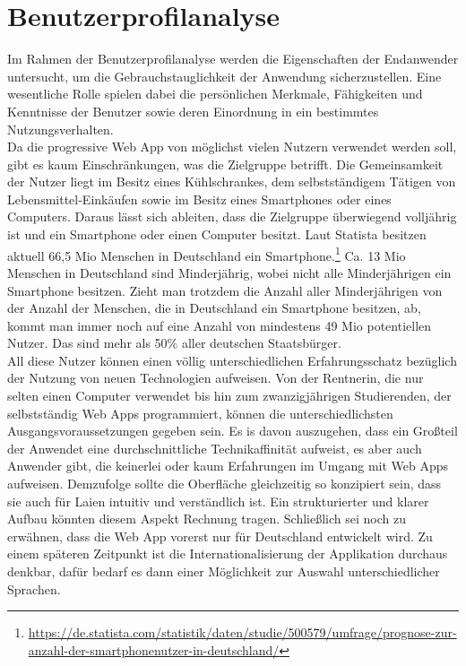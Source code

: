\section{Benutzerprofilanalyse}
Im Rahmen der Benutzerprofilanalyse werden die Eigenschaften der Endanwender untersucht, um die Gebrauchstauglichkeit der Anwendung sicherzustellen. Eine wesentliche
Rolle spielen dabei die persönlichen Merkmale, Fähigkeiten und Kenntnisse der Benutzer
sowie deren Einordnung in ein bestimmtes Nutzungsverhalten.\\
Da die progressive Web App von möglichst vielen Nutzern verwendet werden soll, gibt es kaum Einschränkungen, was die Zielgruppe betrifft. Die Gemeinsamkeit der Nutzer liegt im Besitz eines Kühlschrankes, dem selbstständigem Tätigen von Lebensmittel-Einkäufen sowie im Besitz eines Smartphones oder eines Computers. Daraus lässt sich ableiten, dass die Zielgruppe überwiegend volljährig ist und ein Smartphone oder einen Computer besitzt. Laut Statista besitzen aktuell 66,5 Mio Menschen in Deutschland ein Smartphone.\footnote{\url{https://de.statista.com/statistik/daten/studie/500579/umfrage/prognose-zur-anzahl-der-smartphonenutzer-in-deutschland/}} Ca. 13 Mio Menschen in Deutschland sind Minderjährig, wobei nicht alle Minderjährigen ein Smartphone besitzen. Zieht man trotzdem die Anzahl aller Minderjährigen von der Anzahl der Menschen, die in Deutschland ein Smartphone besitzen, ab, kommt man immer noch auf eine Anzahl von mindestens 49 Mio potentiellen Nutzer. Das sind  mehr als 50\% aller deutschen Staatsbürger.\\
All diese Nutzer können einen völlig unterschiedlichen Erfahrungsschatz bezüglich der Nutzung von neuen Technologien aufweisen. Von der Rentnerin, die nur selten einen Computer verwendet bis hin zum zwanzigjährigen Studierenden, der selbstständig Web Apps programmiert, können die unterschiedlichsten Ausgangsvoraussetzungen gegeben sein. Es is davon auszugehen, dass ein Großteil der Anwendet eine durchschnittliche Technikaffinität aufweist, es aber auch Anwender gibt, die keinerlei oder kaum Erfahrungen im Umgang mit Web Apps aufweisen. Demzufolge sollte die Oberfläche gleichzeitig so konzipiert sein, dass sie auch für Laien intuitiv und verständlich ist. Ein strukturierter und klarer Aufbau könnten diesem Aspekt Rechnung tragen. Schließlich sei noch zu erwähnen, dass die Web App vorerst nur für Deutschland entwickelt wird. Zu einem späteren Zeitpunkt ist die Internationalisierung der Applikation durchaus denkbar, dafür bedarf es dann einer Möglichkeit zur Auswahl unterschiedlicher Sprachen.



